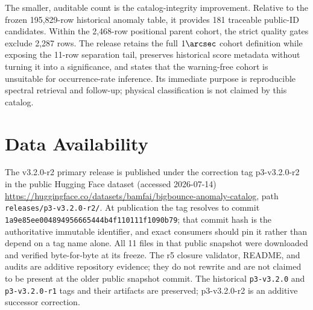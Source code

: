 \documentclass[twocolumn,linenumbers]{aastex702}
\newcommand{\releaseVersion}{v3.2.0-r2}
\newcommand{\releaseTag}{p3-v3.2.0-r2}
\newcommand{\releaseRevision}{1a9e85ee004894956665444b4f110111f1090b79}
\begin{document}
The smaller, auditable count is the catalog-integrity improvement.  Relative to the frozen
195,829-row historical anomaly table, it provides 181 traceable public-ID candidates.  Within the
2,468-row positional parent cohort, the strict quality gates exclude 2,287 rows.  The release retains the full $1\arcsec$ cohort definition while exposing
the 11-row separation tail, preserves historical score metadata without turning it into a
significance, and states that the warning-free cohort is unsuitable for occurrence-rate
inference.  Its immediate purpose is reproducible spectral retrieval and follow-up; physical
classification is not claimed by this catalog.

\section*{Data Availability}

The \releaseVersion{} primary release is published under the correction tag \releaseTag{} in the
public Hugging Face dataset (accessed 2026-07-14)
\url{https://huggingface.co/datasets/bamfai/bigbounce-anomaly-catalog}, path
\nolinkurl{releases/p3-v3.2.0-r2/}.  At publication the tag resolves to commit
\texttt{\releaseRevision}; that commit hash is the authoritative immutable identifier, and exact
consumers should pin it rather than depend on a tag name alone.  All 11 files in that public
snapshot were downloaded and verified byte-for-byte at its freeze.  The r5 closure validator,
README, and audits are additive repository evidence; they do not rewrite and are not claimed to
be present at the older public snapshot commit.  The
historical \texttt{p3-v3.2.0} and \texttt{p3-v3.2.0-r1} tags and their artifacts are preserved;
\releaseTag{} is an additive successor correction.
\end{document}
